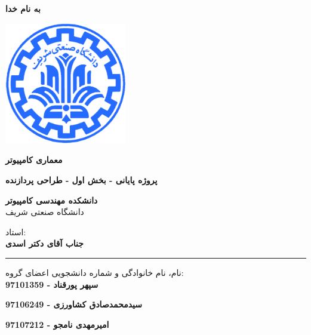 \documentclass[12pt,titlepage,a4page , tikz , multi,table , svgnames,xcdraw]{article}
\begin{document}
\begin{titlepage}

 \begin{center}
        
       \vspace*{1cm}

 \vspace{1cm}
       \textbf{ \Huge{به نام خدا} }
       \vspace{0.4cm}
       
       \includegraphics[width=0.4\textwidth]{sharif1.png}
       
 	\vspace{0.7cm}
       \textbf{ \LARGE{معماری کامپیوتر} }

 
   \vspace{0.7cm}
  \textbf{ \Large{ پروژه پایانی - بخش اول - طراحی پردازنده} }
   \vspace{0.5cm}
       
 
      \large \textbf{دانشکده مهندسی کامپیوتر}\\\vspace{0.2cm}
    \large   دانشگاه صنعتی شریف\\\vspace{0.25cm}
      
استاد:\\
    \textbf{{جناب آقای دکتر اسدی}}

    \vspace{0.15cm}
    \noindent\rule[1ex]{\linewidth}{3pt}
    
    \vspace{0.5cm}
نام، نام خانوادگی و شماره دانشجویی اعضای گروه:\\
    \textbf{{سپهر پورقناد - 97101359}}
        \vspace{0.1cm}
        
     \textbf{{سیدمحمدصادق کشاورزی - 97106249}}
        \vspace{0.1cm}
        
       \textbf{{امیرمهدی نامجو - 97107212}}
        \vspace{0.1cm}


\end{center}
\end{titlepage}
\end{document}
